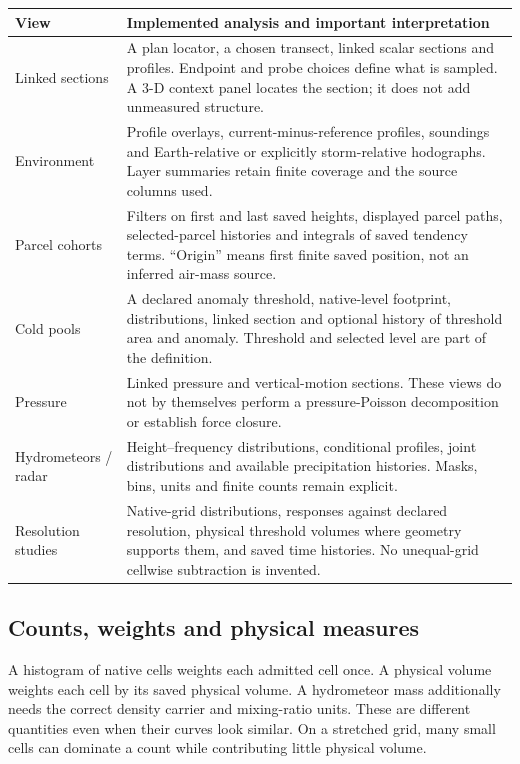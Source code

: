\begin{longtable}{@{}p{}p{}@{}}
\toprule
View & Implemented analysis and important interpretation\\
\midrule
\endhead
Linked sections & A plan locator, a chosen transect, linked scalar sections and
profiles. Endpoint and probe choices define what is sampled. A 3-D context panel
locates the section; it does not add unmeasured structure.\\[0.6em]
Environment & Profile overlays, current-minus-reference profiles, soundings and
Earth-relative or explicitly storm-relative hodographs. Layer summaries retain
finite coverage and the source columns used.\\[0.6em]
Parcel cohorts & Filters on first and last saved heights, displayed parcel paths,
selected-parcel histories and integrals of saved tendency terms. ``Origin'' means
first finite saved position, not an inferred air-mass source.\\[0.6em]
Cold pools & A declared anomaly threshold, native-level footprint, distributions,
linked section and optional history of threshold area and anomaly. Threshold and
selected level are part of the definition.\\[0.6em]
Pressure & Linked pressure and vertical-motion sections. These views do not by
themselves perform a pressure-Poisson decomposition or establish force closure.\\[0.6em]
Hydrometeors / radar & Height--frequency distributions, conditional profiles,
joint distributions and available precipitation histories. Masks, bins, units
and finite counts remain explicit.\\[0.6em]
Resolution studies & Native-grid distributions, responses against declared
resolution, physical threshold volumes where geometry supports them, and saved
time histories. No unequal-grid cellwise subtraction is invented.\\
\bottomrule
\end{longtable}

\subsection{Counts, weights and physical measures}
A histogram of native cells weights each admitted cell once. A physical volume
weights each cell by its saved physical volume. A hydrometeor mass additionally
needs the correct density carrier and mixing-ratio units. These are different
quantities even when their curves look similar. On a stretched grid, many small
cells can dominate a count while contributing little physical volume.

